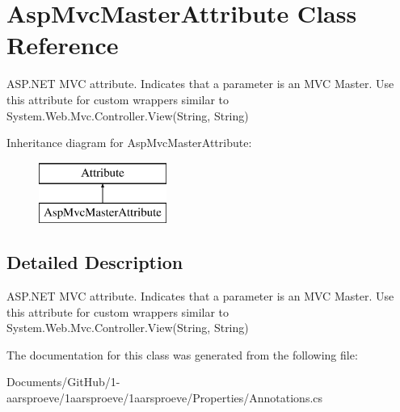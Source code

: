 \hypertarget{class_asp_mvc_master_attribute}{}\section{Asp\+Mvc\+Master\+Attribute Class Reference}
\label{class_asp_mvc_master_attribute}


A\+S\+P.\+N\+E\+T M\+V\+C attribute. Indicates that a parameter is an M\+V\+C Master. Use this attribute for custom wrappers similar to {\ttfamily System.\+Web.\+Mvc.\+Controller.\+View(\+String, String)}  


Inheritance diagram for Asp\+Mvc\+Master\+Attribute\+:\begin{figure}[H]
\begin{center}
\leavevmode
\includegraphics[height=2.000000cm]{class_asp_mvc_master_attribute}
\end{center}
\end{figure}


\subsection{Detailed Description}
A\+S\+P.\+N\+E\+T M\+V\+C attribute. Indicates that a parameter is an M\+V\+C Master. Use this attribute for custom wrappers similar to {\ttfamily System.\+Web.\+Mvc.\+Controller.\+View(\+String, String)} 



The documentation for this class was generated from the following file\+:\begin{DoxyCompactItemize}
\item 
Documents/\+Git\+Hub/1-\/aarsproeve/1aarsproeve/1aarsproeve/\+Properties/Annotations.\+cs\end{DoxyCompactItemize}
